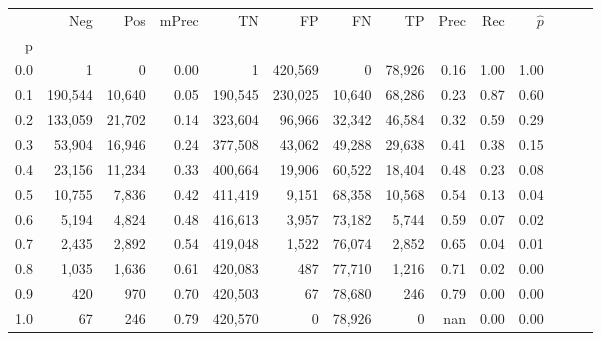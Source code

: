 \begin{tabular}{rrrrrrrrrrrrrr}
\toprule
{} &      Neg &     Pos & mPrec &       TN &       FP &      FN &      TP &  Prec &   Rec & $\hat{p}$ \\
p   &          &         &       &          &          &         &         &       &       &           \\
\midrule
0.0 &        1 &       0 &  0.00 &        1 &  420,569 &       0 &  78,926 &  0.16 &  1.00 &      1.00 \\
0.1 &  190,544 &  10,640 &  0.05 &  190,545 &  230,025 &  10,640 &  68,286 &  0.23 &  0.87 &      0.60 \\
0.2 &  133,059 &  21,702 &  0.14 &  323,604 &   96,966 &  32,342 &  46,584 &  0.32 &  0.59 &      0.29 \\
0.3 &   53,904 &  16,946 &  0.24 &  377,508 &   43,062 &  49,288 &  29,638 &  0.41 &  0.38 &      0.15 \\
0.4 &   23,156 &  11,234 &  0.33 &  400,664 &   19,906 &  60,522 &  18,404 &  0.48 &  0.23 &      0.08 \\
0.5 &   10,755 &   7,836 &  0.42 &  411,419 &    9,151 &  68,358 &  10,568 &  0.54 &  0.13 &      0.04 \\
0.6 &    5,194 &   4,824 &  0.48 &  416,613 &    3,957 &  73,182 &   5,744 &  0.59 &  0.07 &      0.02 \\
0.7 &    2,435 &   2,892 &  0.54 &  419,048 &    1,522 &  76,074 &   2,852 &  0.65 &  0.04 &      0.01 \\
0.8 &    1,035 &   1,636 &  0.61 &  420,083 &      487 &  77,710 &   1,216 &  0.71 &  0.02 &      0.00 \\
0.9 &      420 &     970 &  0.70 &  420,503 &       67 &  78,680 &     246 &  0.79 &  0.00 &      0.00 \\
1.0 &       67 &     246 &  0.79 &  420,570 &        0 &  78,926 &       0 &   nan &  0.00 &      0.00 \\
\bottomrule
\end{tabular}
